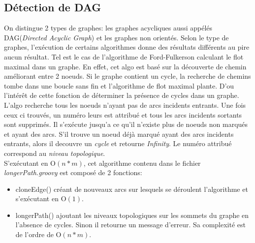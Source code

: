\documentclass[onecolumn, 12pt]{article}
\begin{document}
\subsection{D\'etection de DAG}
On distingue 2 types de graphes: les graphes acycliques aussi app\'el\'es DAG(\emph{Directed Acyclic Graph}) et les graphes non orient\'es. Selon le type de graphes, l'ex\'ecution de certains algorithmes donne des r\'esultats diff\'erents au pire aucun r\'esultat. Tel est le cas de l'algorithme de Ford-Fulkerson calculant le flot maximal dans un graphe. En effet, cet algo est bas\'e sur la d\'ecouverte de chemin am\'eliorant entre 2 noeuds. Si le graphe contient un cycle, la recherche de chemins tombe dans une boucle sans fin et l'algorithme de flot maximal plante. D'ou l'int\'er\^et de cette fonction de d\'eterminer la pr\'esence de cycles dans un graphe.\\
L'algo recherche tous les noeuds n'ayant pas de arcs incidents entrants. Une fois ceux ci trouv\'es, un num\'ero leurs est attribu\'e et tous les arcs incidents sortants sont supprim\'es. Il s'ex\'ecute jusqu'a ce qu'il n'existe plus de noeuds non marqu\'es et ayant des arcs. S'il trouve un noeud d\'ej\`a marqu\'e ayant des arcs incidents entrants, alors il decouvre un \emph{cycle} et retourne \emph{Infinity}. Le num\'ero attribu\'e correspond au \emph{niveau topologique}. \\
S'ex\'ecutant en $\mathrm{O}{(n*m)}$, cet algorithme contenu dans le fichier \emph{longerPath.groovy} est compos\'e de 2 fonctions:
\begin{itemize}
\item cloneEdge() cr\'eant de nouveaux arcs sur lesquels se d\'eroulent l'algorithme et s'ex\'ecutant en  $\mathrm{O}{(1)}$.
\item longerPath() ajoutant les niveaux topologiques sur les sommets du graphe en l'absence de cycles. Sinon il retourne un message d'erreur. Sa complexit\'e est de l'ordre de  $\mathrm{O}{(n*m)}$.
\end{itemize} 
\end{document}
